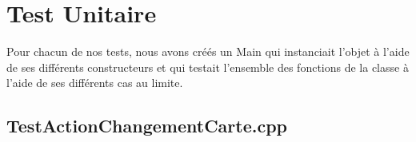 \chapter{Test Unitaire}
    
    Pour chacun de nos tests, nous avons créés un Main qui instanciait l'objet à l'aide de ses différents constructeurs et qui testait l'ensemble des fonctions de la classe à l'aide de ses différents cas au limite. 
    
\section{TestActionChangementCarte.cpp}
